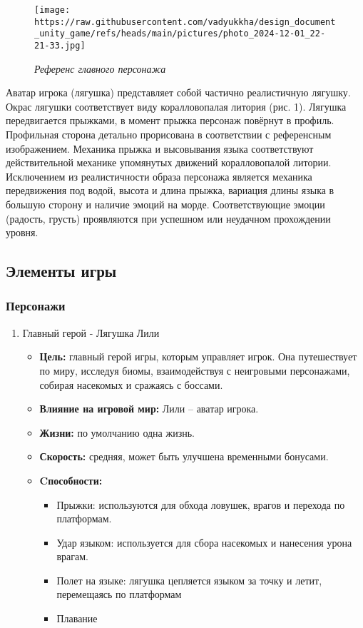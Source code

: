 \documentclass{article}
\begin{document}
\begin{wrapfigure}{r}{0.4\textwidth}
    \centering
    \texttt{[image: https://raw.githubusercontent.com/vadyukkha/design\_document\_unity\_game/refs/heads/main/pictures/photo\_2024-12-01\_22-21-33.jpg]} 
    \caption{\textit {Референс главного персонажа}}
    \label{fig:example}
\end{wrapfigure} 
Аватар игрока (лягушка) представляет собой частично реалистичную лягушку. Окрас лягушки соответствует виду коралловопалая литория (рис. 1).  Лягушка передвигается прыжками, в  момент прыжка персонаж повёрнут в профиль. Профильная сторона детально прорисована в соответствии с референсным изображением. Механика прыжка и высовывания языка соответствуют действительной механике упомянутых движений коралловопалой литории. Исключением из реалистичности образа персонажа является механика передвижения под водой, высота и длина прыжка, вариация длины языка в большую сторону и наличие эмоций на морде. Соответствующие эмоции (радость, грусть) проявляются при успешном или неудачном прохождении уровня.

\subsection{Элементы игры}
\subsubsection{Персонажи}

\begin{enumerate}
\item Главный герой - Лягушка Лили
    \begin{itemize}
     \item \textbf{Цель:} главный герой игры, которым управляет игрок. Она путешествует по миру, исследуя биомы, взаимодействуя с неигровыми персонажами, собирая насекомых и сражаясь с боссами.
     \item \textbf{Влияние на игровой мир:} Лили – аватар игрока.
     \item \textbf{Жизни:} по умолчанию одна жизнь.
     \item \textbf{Скорость:} средняя, может быть улучшена временными бонусами.
     \item \textbf{Cпособности:}
     \begin{itemize}
            \item Прыжки: используются для обхода ловушек, врагов и перехода по платформам.
            \item Удар языком: используется для сбора насекомых и нанесения урона врагам.
            \item Полет на языке: лягушка цепляется языком за точку и летит, перемещаясь по платформам
            \item Плавание
     \end {itemize}
     \end{itemize}
\end{enumerate}
\end{document}
